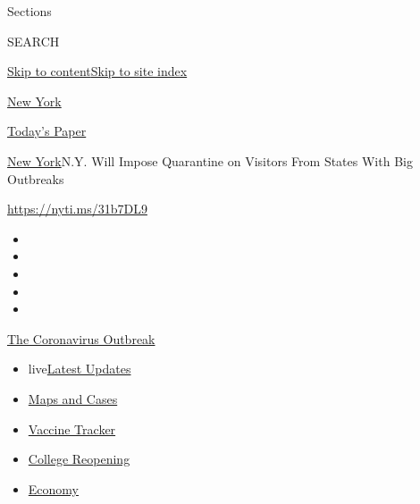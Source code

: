 Sections

SEARCH

\protect\hyperlink{site-content}{Skip to
content}\protect\hyperlink{site-index}{Skip to site index}

\href{https://www.nytimes.com/section/nyregion}{New York}

\href{https://myaccount.nytimes.com/auth/login?response_type=cookie\&client_id=vi}{}

\href{https://www.nytimes.com/section/todayspaper}{Today's Paper}

\href{/section/nyregion}{New York}\textbar{}N.Y. Will Impose Quarantine
on Visitors From States With Big Outbreaks

\url{https://nyti.ms/31b7DL9}

\begin{itemize}
\item
\item
\item
\item
\item
\end{itemize}

\href{https://www.nytimes.com/news-event/coronavirus?action=click\&pgtype=Article\&state=default\&region=TOP_BANNER\&context=storylines_menu}{The
Coronavirus Outbreak}

\begin{itemize}
\tightlist
\item
  live\href{https://www.nytimes.com/2020/08/04/world/coronavirus-cases.html?action=click\&pgtype=Article\&state=default\&region=TOP_BANNER\&context=storylines_menu}{Latest
  Updates}
\item
  \href{https://www.nytimes.com/interactive/2020/us/coronavirus-us-cases.html?action=click\&pgtype=Article\&state=default\&region=TOP_BANNER\&context=storylines_menu}{Maps
  and Cases}
\item
  \href{https://www.nytimes.com/interactive/2020/science/coronavirus-vaccine-tracker.html?action=click\&pgtype=Article\&state=default\&region=TOP_BANNER\&context=storylines_menu}{Vaccine
  Tracker}
\item
  \href{https://www.nytimes.com/2020/08/02/us/covid-college-reopening.html?action=click\&pgtype=Article\&state=default\&region=TOP_BANNER\&context=storylines_menu}{College
  Reopening}
\item
  \href{https://www.nytimes.com/live/2020/08/04/business/stock-market-today-coronavirus?action=click\&pgtype=Article\&state=default\&region=TOP_BANNER\&context=storylines_menu}{Economy}
\end{itemize}

